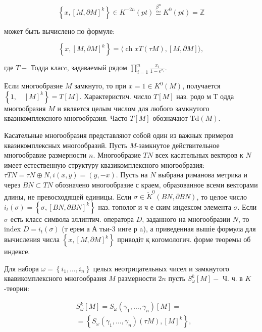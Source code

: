 \documentclass[10pt]{article}
\begin{document}
\[

\left\{x,[M, \partial M]^{k}\right\} \in K^{-2 n}(p t) \stackrel{\beta^{n}}{\cong} K^{0}(p t)=\mathbb{Z}

\]



может быть вычислено по формуле:



\[

\left\{x,[M, \partial M]^{k}\right\}=\langle\operatorname{ch} x T(\tau M),[M, \partial M]\rangle,

\]



где $T-$ Тодда класc, задаваемый рядом $\prod_{i=1}^{n} \frac{x_{i}}{1-e^{x_{i}}}$.



Если многообразие $M$ замкнуто, то при $x=1 \in K^{0}(M)$, получается $\left\{1, \quad[M]^{k}\right\}=T[M]$. Характеристич. число $T[M]$ наз. родо м Т одда многообразия $M$ и является целым числом для любого замкнутого квазнкомплексного многообразия. Часто $T[M]$ обозначают $\mathrm{Td}(M)$.



Касательные многообразия представляют собой один из важных примеров квазикомплексных многообразий. Пусть $M$-замкнутое действительное многообравие размерности $n$. Многообразие $T N$ всех касательных векторов к $N$ имеет естественную структуру квазикомплексного многообразия: $\tau T N=\tau N \oplus N, i(x, y)=(y,-x)$. Пусть на $N$ выбрана риманова метрика и через $B N \subset T N$ обозначено многообразие с краем, образованное всеми векторами длины, не превосходящей единицы. Если $\sigma \in \tilde{K}^{0}(B N, \partial B N)$, то целое число $i_{t}(\sigma)=\left\{\sigma,[B N, \partial B N]^{k}\right\}$ наз. тополог и ч е ским индексом элемента $\sigma$. Если $\sigma$ есть класс символа эллиптич. оператора $D$, заданного на многообразии $N$, то index $D=i_{t}(\sigma)$ (т ерем а А тьи-3 инге р a), а приведенная вышіе формула для вычисления числа $\left\{x,[M, \partial M]^{k}\right\}$ приводіт қ когомологич. форме теоремы об индексе.



Для набора $\omega=\left\{i_{1}, \ldots, i_{n}\right\}$ целых неотрицательных чисел и замкнутого квавикомплексного многообразия $M$ размерности $2 n$ пусть $S_{\omega}^{k}[M]-$ Ч. ч. в $K$-теории:



\[

\begin{aligned}

& S_{\omega}^{k}[M]=S_{\omega}\left(\gamma_{1}, \ldots, \gamma_{n}\right)[M]= \\

& =\left\{S_{\omega}\left(\gamma_{1}, \ldots, \gamma_{n}\right)(\tau M),[M]^{k}\right\},

\end{aligned}

\]
\end{document}
